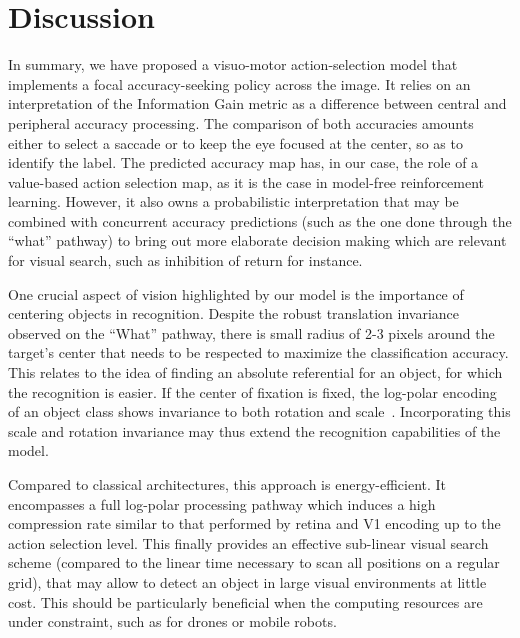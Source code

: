 \section{Discussion}
\label{sec:discussion}

In summary, we have proposed a visuo-motor action-selection model that implements a focal accuracy-seeking policy across the image. It relies on an interpretation of the Information Gain metric as a difference between central and peripheral accuracy processing.  The comparison of both accuracies amounts either to select a saccade or to keep the eye focused at the center, so as to identify the label. The predicted accuracy map has, in our case, the role of a value-based action selection map, as it is the case in model-free reinforcement learning. However, it also owns a probabilistic interpretation that may be combined with concurrent accuracy predictions (such as the one done through the ``what'' pathway) to bring out more elaborate decision making which are relevant for visual search, such as inhibition of return for instance. 

One crucial aspect of vision highlighted by our model is the importance of centering objects in recognition. Despite the robust translation invariance observed on the ``What'' pathway, there is small radius of 2-3 pixels around the target's center that needs to be respected to maximize the classification accuracy. This relates to the idea of finding an absolute referential for an object, for which the recognition is easier. If the center of fixation is fixed, the log-polar encoding of an object class shows invariance to both rotation and scale~\citep{Traver10}. Incorporating this scale and rotation invariance may thus extend the recognition capabilities of the model.

Compared to classical architectures, this approach is energy-efficient. It encompasses a full log-polar processing pathway which induces a high compression rate similar to that performed by retina and V1 encoding up to the action selection level. This finally provides an effective sub-linear visual search scheme (compared to the linear time necessary to scan all positions on a regular grid), that may allow to detect an object in large visual environments at little cost. This should be particularly beneficial when the computing resources are under constraint, such as for drones or mobile robots. 

